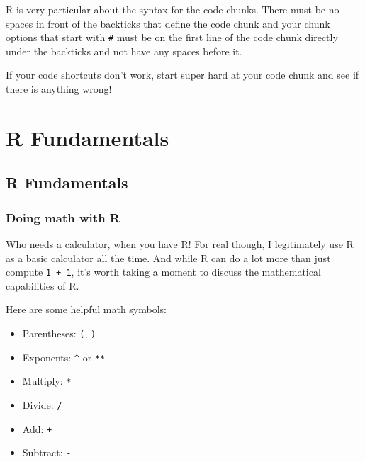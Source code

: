 \documentclass[
  letterpaper,
  DIV=11,
  numbers=noendperiod]{scrreprt}
\providecommand{\tightlist}{%
  \setlength{\itemsep}{0pt}\setlength{\parskip}{0pt}}\usepackage{longtable,booktabs,array}
\begin{document}
\begin{tcolorbox}[enhanced jigsaw, rightrule=.15mm, toptitle=1mm, title=\textcolor{quarto-callout-warning-color}{\faExclamationTriangle}\hspace{0.5em}{Common issue: I can't run my code}, leftrule=.75mm, bottomtitle=1mm, colbacktitle=quarto-callout-warning-color!10!white, coltitle=black, titlerule=0mm, opacityback=0, colframe=quarto-callout-warning-color-frame, arc=.35mm, opacitybacktitle=0.6, bottomrule=.15mm, left=2mm, breakable, toprule=.15mm, colback=white]

R is very particular about the syntax for the code chunks. There must be
no spaces in front of the backticks that define the code chunk and your
chunk options that start with \texttt{\#\textbar{}} must be on the first
line of the code chunk directly under the backticks and not have any
spaces before it.

If your code shortcuts don't work, start super hard at your code chunk
and see if there is anything wrong!

\end{tcolorbox}

\part{R Fundamentals}

\chapter{R Fundamentals}\label{r-fundamentals-1}

\section{Doing math with R}\label{doing-math-with-r}

Who needs a calculator, when you have R! For real though, I legitimately
use R as a basic calculator all the time. And while R can do a lot more
than just compute \texttt{1\ +\ 1}, it's worth taking a moment to
discuss the mathematical capabilities of R.

Here are some helpful math symbols:

\begin{itemize}
\tightlist
\item
  Parentheses: \texttt{(}, \texttt{)}
\item
  Exponents: \texttt{\^{}} or \texttt{**}
\item
  Multiply: \texttt{*}
\item
  Divide: \texttt{/}
\item
  Add: \texttt{+}
\item
  Subtract: \texttt{-}
\end{itemize}
\end{document}
